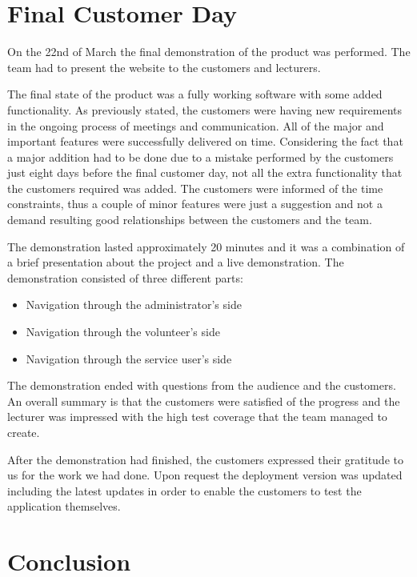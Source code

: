 \documentclass{l3proj}
\begin{document}
\section{Final Customer Day}
\label{sec:finalDay}

On the 22nd of March the final demonstration of the product was performed. The team had to present the website to the customers and lecturers.

The final state of the product was a fully working software with some added functionality. As previously stated, the customers were having new requirements in the ongoing process of meetings and communication. All of the major and important features were successfully delivered on time. Considering the fact that a major addition had to be done due to a mistake performed by the customers just eight days before the final customer day, not all the extra functionality that the customers required was added. The customers were informed of the time constraints, thus a couple of minor features were just a suggestion and not a demand resulting good relationships between the customers and the team.

The demonstration lasted approximately 20 minutes and it was a combination of a brief presentation about the project and a live demonstration. The demonstration consisted of three different parts:

\begin{itemize}
	\item Navigation through the administrator's side
	\item Navigation through the volunteer's side
	\item Navigation through the service user's side
\end{itemize}

The demonstration ended with questions from the audience and the customers. An overall summary is that the customers were satisfied of the progress and the lecturer was impressed with the high test coverage that the team managed to create.

After the demonstration had finished, the customers expressed their gratitude to us for the work we had done. Upon request the deployment version was updated including the latest updates in order to enable the customers to test the application themselves.

\section{Conclusion}
\end{document}
